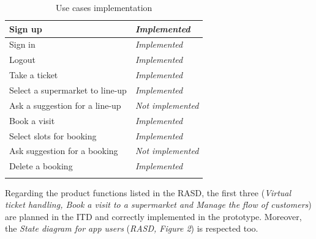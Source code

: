 \documentclass[a4paper,oneside,11pt]{book}
\begin{document}
    \begin{longtable}[c] { |H{0.40\textwidth}|>{\em}C{0.30\textwidth}| }
        \hline
        Sign up & Implemented \\ \hline
        Sign in & Implemented \\ \hline
        Logout & Implemented\\ \hline
        Take a ticket & Implemented\\ \hline
        Select a supermarket to line-up & Implemented\\ \hline
        Ask a suggestion for a line-up & Not implemented\\ \hline
        Book a visit & Implemented \\ \hline
        Select slots for booking & Implemented \\ \hline
        Ask suggestion for a booking & Not implemented\\ \hline
        Delete a booking & Implemented \\ \hline
    \caption{Use cases implementation}
    \label{table:use_cases}
    \end{longtable}
        
    
    Regarding the product functions listed in the RASD, the first three (\textit{Virtual ticket handling, Book a visit to a supermarket and Manage the flow of customers}) are planned in the ITD and correctly implemented in the prototype. Moreover, the \textit{State diagram for app users} (\textit{RASD, Figure 2}) is respected too.


    \newpage
\end{document}
